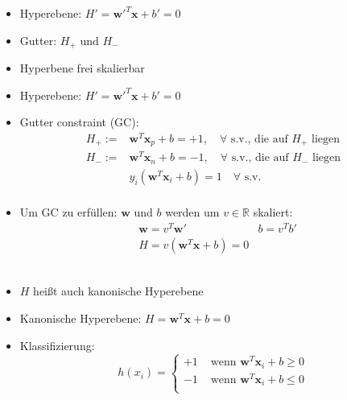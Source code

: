 \begin{frame}
     {
        \begin{itemize}
            \item Hyperebene: $ H' = \boldsymbol{w}'^T \boldsymbol{x} + b' = 0 $
            \item Gutter: $H_+$ und $H_-$
            \item Hyperbene frei skalierbar
        \end{itemize}
    } {
        \begin{itemize}
            \item Hyperebene: $ H' = \boldsymbol{w}'^T \boldsymbol{x} + b' = 0 $
            \item Gutter constraint (GC):
                \begin{align*}
                    H_+ := & \boldsymbol{w}^T \boldsymbol{x}_p + b = +1, \quad \forall \text{ s.v., die auf } H_+ \text{ liegen} \\
                    H_- := & \boldsymbol{w}^T \boldsymbol{x}_n + b = -1, \quad \forall \text{ s.v., die auf } H_- \text{ liegen} \\
                    & y_i ( \boldsymbol{w}^T \boldsymbol{x}_i + b ) = 1 \quad \forall \text{ s.v. } \\
                \end{align*}
            \item Um GC zu erfüllen: $ \boldsymbol{w} $ und $b$ werden um $ v \in \mathbb{R} $ skaliert:
                \begin{align*}
                    & \boldsymbol{w} = v^T \boldsymbol{w}' & b = v^T b' \\
                    & H = v ( \boldsymbol{w}^T \boldsymbol{x} + b ) = 0
                \end{align*} \\
            \item $H$ heißt auch kanonische Hyperebene
        \end{itemize}
    } {
        \begin{itemize}
            \item Kanonische Hyperebene: $ H = \boldsymbol{w}^T \boldsymbol{x} + b = 0 $
            \item Klassifizierung:
                \begin{equation*}
                    h(x_i) = \begin{cases}
                        +1 & \text{ wenn } \boldsymbol{w}^T \boldsymbol{x}_i + b \geq 0 \\
                        -1 & \text{ wenn } \boldsymbol{w}^T \boldsymbol{x}_i + b \leq 0 \\
                    \end{cases}
                \end{equation*}
        \end{itemize}
    }
\end{frame}

